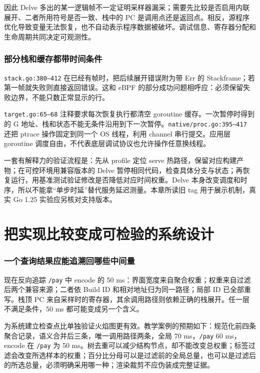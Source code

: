\documentclass[UTF8,fontset=fandol,openany,11pt]{ctexbook}
\begin{document}
因此 Delve 多出的某一逻辑帧不一定证明采样器漏采；需要先比较是否启用内联展开、二者所用符号是否一致、栈中的 PC 是调用点还是返回点。相反，源程序优化导致变量无法恢复，也不自动表示程序数据被破坏。调试信息、寄存器分配和生命周期共同决定可观测性。

\subsubsection{部分栈和缓存都带时间条件}
\texttt{stack.\allowbreak{}go:\allowbreak{}380–412} 在已经有帧时，把后续展开错误附为带 Err 的 Stackframe；若第一帧就失败则直接返回错误。这和 eBPF 的部分成功问题相呼应：必须保留失败边界，不能只数正常显示的行。

\texttt{target.\allowbreak{}go:\allowbreak{}65–68} 注释要求每次恢复执行都清空 goroutine 缓存。一次暂停时得到的 G 地址、栈和状态不能无条件沿用到下一次暂停。\texttt{native/\allowbreak{}proc.\allowbreak{}go:\allowbreak{}395–417} 还把 ptrace 操作固定到同一个 OS 线程，利用 channel 串行提交。应用层 goroutine 调度自由，不代表底层调试协议也允许操作任意换线程。\cite{proj-delve}

一套有解释力的验证流程是：先从 profile 定位 serve 热路径，保留对应构建产物；在可控环境用兼容版本的 Delve 暂停相同代码，检查具体分支与状态；再恢复运行，用基准测试验证修改是否降低对应时间权重。Delve 本身改变调度和时序，所以不能拿“单步时延”替代服务延迟测量。本章所读旧 tag 用于展示机制，真实 Go 1.25 实验应另核对支持版本。

\section{把实现比较变成可检验的系统设计}
\subsubsection{一个查询结果应能追溯回哪些中间量}
现在反向追踪 \texttt{/\allowbreak{}pay} 中 encode 的 50 ms：界面宽度来自聚合权重；权重来自过滤后两个兼容来源；二者依 Build ID 和相对地址归为同一路径；局部 ID 已全部重写。栈顶 PC 来自采样时的寄存器，其余调用路径则依赖正确的栈展开。任一层不满足条件，50 ms 都可能变成另一个含义。

为系统建立检查点比单独验证火焰图更有效。教学案例的预期如下：规范化前四条聚合记录，语义合并后三条，唯一调用路径两条，全局 70 ms，\texttt{/\allowbreak{}pay} 60 ms，encode 在 \texttt{/\allowbreak{}pay} 为 50 ms。树去重可以减少结构节点，却不能改变总权重；标签过滤会改变所选样本的权重；百分比分母可以是过滤前的全局总量，也可以是过滤后的所选总量，必须明确采用哪一种；渲染裁剪不应伪装成完整证据。
\end{document}
